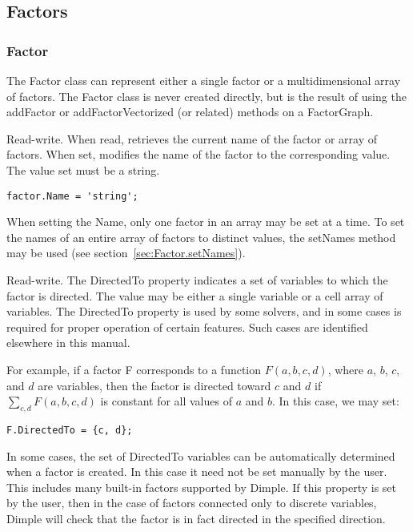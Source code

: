 \subsection{Factors}

\subsubsection{Factor}

The Factor class can represent either a single factor or a multidimensional array of factors.  The Factor class is never created directly, but is the result of using the addFactor or addFactorVectorized (or related) methods on a FactorGraph.



Read-write.  When read, retrieves the current name of the factor or array of factors.  When set, modifies the name of the factor to the corresponding value.  The value set must be a string.

\begin{lstlisting}
factor.Name = 'string';
\end{lstlisting}

When setting the Name, only one factor in an array may be set at a time.  To set the names of an entire array of factors to distinct values, the setNames method may be used (see section~\ref{sec:Factor.setNames}).



Read-write.  The DirectedTo property indicates a set of variables to which the factor is directed.  The value may be either a single variable or a cell array of variables.  The DirectedTo property is used by some solvers, and in some cases is required for proper operation of certain features.  Such cases are identified elsewhere in this manual.

For example, if a factor F corresponds to a function $F(a, b, c, d)$, where $a$, $b$, $c$, and $d$ are variables, then the factor is directed toward $c$ and $d$ if $\sum_{c, d} F(a, b, c, d)$ is constant for all values of $a$ and $b$.  In this case, we may set:

\begin{lstlisting}
F.DirectedTo = {c, d};
\end{lstlisting}

In some cases, the set of DirectedTo variables can be automatically determined when a factor is created.  In this case it need not be set manually by the user.  This includes many built-in factors supported by Dimple.  If this property is set by the user, then in the case of factors connected only to discrete variables, Dimple will check that the factor is in fact directed in the specified direction.


